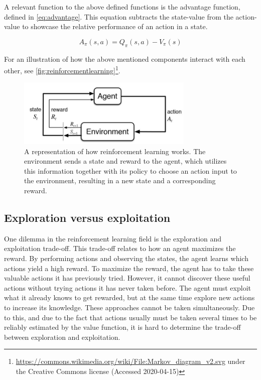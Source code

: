 \documentclass{kththesis}
\begin{document}
A relevant function to the above defined functions is the advantage function, defined in \autoref{eq:advantage}. This equation subtracts the state-value from the action-value to showcase the relative performance of an action in a state. \parencite{wang2015dueling}

\begin{equation}
\label{eq:advantage}
A_\pi(s,a) = Q_\pi(s,a) - V_\pi(s)
\end{equation}

For an illustration of how the above mentioned components interact with each other, see \autoref{fig:reinforcementlearning}\footnote{\url{https://commons.wikimedia.org/wiki/File:Markov_diagram_v2.svg} under the Creative Commons license (Accessed 2020-04-15)}.

\begin{figure}
\centering
\includegraphics[width=0.75\textwidth]{reinforcement-learning.jpg}
\caption{A representation of how reinforcement learning works. The environment sends a state and reward to the agent, which utilizes this information together with its policy to choose an action input to the environment, resulting in a new state and a corresponding reward.}
\label{fig:reinforcementlearning}
\end{figure}

\subsection{Exploration versus exploitation}
\label{subsec:explorevsexploit}
One dilemma in the reinforcement learning field is the exploration and exploitation trade-off. This trade-off relates to how an agent maximizes the reward. By performing actions and observing the states, the agent learns which actions yield a high reward. To maximize the reward, the agent has to take these valuable actions it has previously tried. However, it cannot discover these useful actions without trying actions it has never taken before. The agent must exploit what it already knows to get rewarded, but at the same time explore new actions to increase its knowledge. These approaches cannot be taken simultaneously. Due to this, and due to the fact that actions usually must be taken several times to be reliably estimated by the value function, it is hard to determine the trade-off between exploration and exploitation.
\end{document}
